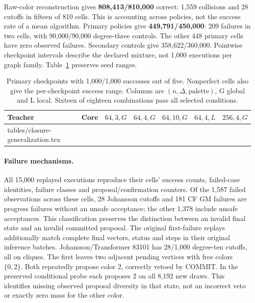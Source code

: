 \documentclass[10pt]{article}
\makeatletter
\let\closureinput\@@input
\makeatother
\begin{document}
Raw-color reconstruction gives \textbf{808,413/810,000} correct: 1,559
collisions and 28 cutoffs in fifteen of 810 cells. This is accounting across
policies, not the success rate of a mean algorithm. Primary policies give
\textbf{449,791/450,000}: 209 failures in two cells, with 90,000/90,000
degree-three controls. The other 448 primary cells have zero observed
failures. Secondary controls give 358,622/360,000.
Pointwise checkpoint intervals describe the declared mixture, not 1,000
executions per graph family. Table~\ref{tab:transfer} preserves seed ranges.

\begin{table}[htbp]\centering\scriptsize
\begin{tabular}{llccccc}
\toprule Teacher & Core & $64,3,G$ & $64,4,G$ & $64,10,G$ & $64,4,L$ & $256,4,G$ \\
\midrule
\closureinput tables/closure-generalization.tex
\bottomrule
\end{tabular}
\caption{Primary checkpoints with 1,000/1,000 successes out of five.
Nonperfect cells also give the per-checkpoint success range. Columns are
$(n,\Delta,\text{palette})$, G global and L local. Sixteen of eighteen
combinations pass all selected conditions.}
\label{tab:transfer}
\end{table}

\paragraph{Failure mechanisms.}
All 15,000 replayed executions reproduce their cells' success counts,
failed-case identities, failure classes and proposal/confirmation counters.
Of the 1,587 failed observations across these cells, 28 Johansson cutoffs
and 181 CF GM failures are progress failures without an unsafe acceptance;
the other 1,378 include unsafe acceptances. This classification preserves
the distinction between an invalid final state and an invalid committed
proposal. The original first-failure replays additionally match complete
final vectors, status and steps in their original inference batches.
Johansson/Transformer 83101 has 28/1,000 degree-ten cutoffs, all on cliques.
The first leaves two adjacent pending vertices with free colors $\{0,2\}$.
Both repeatedly propose color 2, correctly vetoed by COMMIT. In the preserved
conditional probe each proposes 2 on all 8,192 new draws. This identifies
missing observed proposal diversity in that state, not an incorrect veto or
exactly zero mass for the other color.
\end{document}
